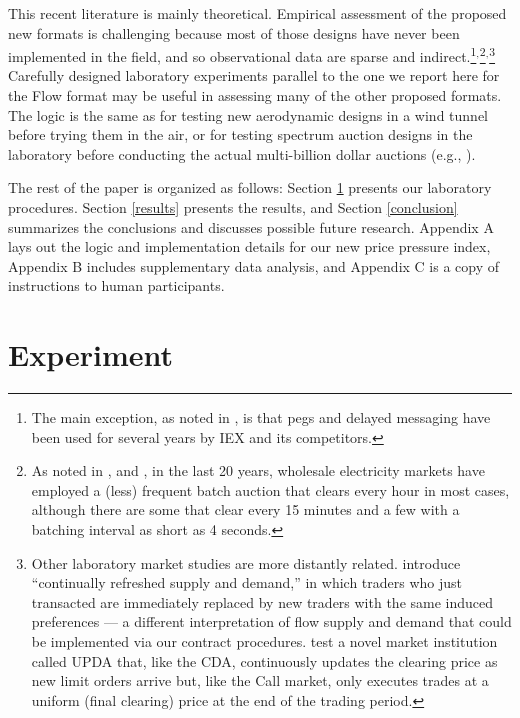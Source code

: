 \documentclass[12pt]{article}
\begin{document}
This recent literature is mainly theoretical. 
Empirical assessment of the proposed new formats is challenging because most of those designs have never been implemented in the field, and so observational data are sparse and indirect.\footnote{
The main exception, as noted in \cite{Aldrich2022}, is that pegs and delayed messaging have been used for several years by IEX and its competitors.}$^,$\footnote{As noted in \cite{cramton2017electricity}, and \cite{cramton2024forward}, 
in the last 20 years, wholesale electricity markets have employed a (less) frequent batch auction that clears every hour in most cases, although there are some that clear every 15 minutes and a few with a batching interval as short as 4 
seconds.}$^,$\footnote{Other laboratory market studies are more distantly related. \cite{brewer2002behavioral} 
introduce ``continually refreshed supply and demand,'' in which traders who just transacted are immediately replaced by new traders with the same induced preferences --- a different interpretation of flow supply and demand that could be implemented via our contract procedures. 
\cite{mccabe1993designing} test a novel market institution called UPDA that, like the CDA, continuously updates the clearing price as new limit orders arrive but, like the Call market, only executes trades at a uniform (final clearing) price at the end of the trading period.}
Carefully designed laboratory experiments parallel to the one we report here for the Flow format may be useful in assessing many of the other proposed formats.
The logic is the same as for testing new aerodynamic designs in a wind tunnel before trying them in the air, or for testing spectrum auction designs in the laboratory before conducting the actual multi-billion dollar auctions (e.g., \cite{Binmore2002}).

The rest of the paper is organized as follows: Section \ref{Experiment} presents our laboratory procedures. Section \ref{results} presents the results, and Section \ref{conclusion} summarizes the conclusions and discusses possible future research. Appendix A lays out the logic and implementation details for our new price pressure index, Appendix B includes supplementary data analysis, and Appendix C is a copy of instructions to human participants.




\section{Experiment}
\label{Experiment}
\end{document}
